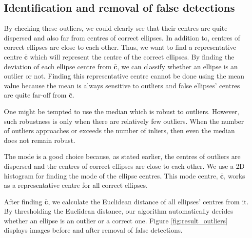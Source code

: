 \documentclass[preprint]{iucr}              %
\begin{document}
\subsection{Identification and removal of false detections}
By checking these outliers, we could clearly see that their centres are quite
dispersed and also far from centres of correct ellipses. 
In addition to, centres of correct ellipses are close to each other.
Thus, we want to find a representative centre $\mathbf{\bar{c}}$ which will
represent the centre of the correct ellipses. 
By finding the deviation of each ellipse centre from $\mathbf{\bar{c}}$, we can
classify whether an ellipse is an outlier or not. 
Finding this representative centre cannot be done using the mean value because
the mean is always sensitive to outliers and false ellipses' centres are quite
far-off from $\mathbf{\bar{c}}$.  

One might be tempted to use the median which is robust to outliers.
However, such robustness is only when there are relatively few outliers.
When the number of outliers approaches or exceeds the number of inliers, then
even the median does not remain robust. 

The mode is a good choice because, as stated earlier, the centres of outliers
are dispersed and the centres of correct ellipses are close to each other. 
We use a 2D histogram for finding the mode of the ellipse centres.
This mode centre, $\mathbf{\bar{c}}$, works as a representative centre for all
correct ellipses.  

After finding $\mathbf{\bar{c}}$, we calculate the Euclidean distance of all
ellipses' centres from it. 
By thresholding the Euclidean distance, our algorithm automatically decides
whether an ellipse is an outlier or a correct one. 
Figure \ref{fig:result_outliers} displays images before and after removal of
false detections. 
\end{document}
